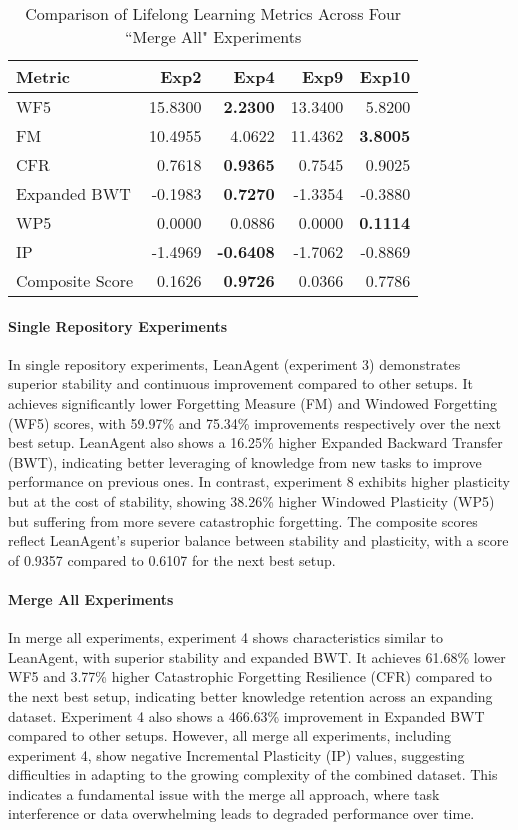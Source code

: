 \documentclass{article} %
\begin{document}
\begin{table}
\caption{Comparison of Lifelong Learning Metrics Across Four ``Merge All" Experiments}
\label{tab:merge-all-experiment-metrics}
\centering
\begin{tabular}{lrrrr}
\hline
Metric & Exp2 & Exp4 & Exp9 & Exp10 \\
\hline
WF5 & 15.8300 & \textbf{2.2300} & 13.3400 & 5.8200 \\
FM & 10.4955 & 4.0622 & 11.4362 & \textbf{3.8005} \\
CFR & 0.7618 & \textbf{0.9365} & 0.7545 & 0.9025 \\
Expanded BWT & -0.1983 & \textbf{0.7270} & -1.3354 & -0.3880 \\
WP5 & 0.0000 & 0.0886 & 0.0000 & \textbf{0.1114} \\
IP & -1.4969 & \textbf{-0.6408} & -1.7062 & -0.8869 \\
\hline
Composite Score & 0.1626 & \textbf{0.9726} & 0.0366 & 0.7786 \\
\hline
\end{tabular}
\end{table}

\paragraph{Single Repository Experiments}
In single repository experiments, LeanAgent (experiment 3) demonstrates superior stability and continuous improvement compared to other setups. It achieves significantly lower Forgetting Measure (FM) and Windowed Forgetting (WF5) scores, with 59.97\% and 75.34\% improvements respectively over the next best setup. LeanAgent also shows a 16.25\% higher Expanded Backward Transfer (BWT), indicating better leveraging of knowledge from new tasks to improve performance on previous ones. In contrast, experiment 8 exhibits higher plasticity but at the cost of stability, showing 38.26\% higher Windowed Plasticity (WP5) but suffering from more severe catastrophic forgetting. The composite scores reflect LeanAgent's superior balance between stability and plasticity, with a score of 0.9357 compared to 0.6107 for the next best setup.

\paragraph{Merge All Experiments}
In merge all experiments, experiment 4 shows characteristics similar to LeanAgent, with superior stability and expanded BWT. It achieves 61.68\% lower WF5 and 3.77\% higher Catastrophic Forgetting Resilience (CFR) compared to the next best setup, indicating better knowledge retention across an expanding dataset. Experiment 4 also shows a 466.63\% improvement in Expanded BWT compared to other setups. However, all merge all experiments, including experiment 4, show negative Incremental Plasticity (IP) values, suggesting difficulties in adapting to the growing complexity of the combined dataset. This indicates a fundamental issue with the merge all approach, where task interference or data overwhelming leads to degraded performance over time.
\end{document}
